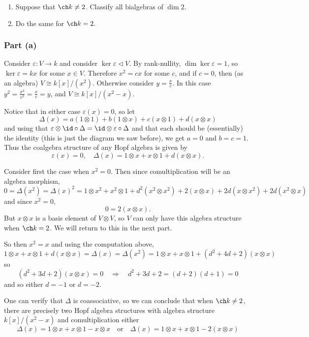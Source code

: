 \documentclass[12pt]{article}
\begin{document}
\begin{prob}
	\begin{enumerate}
		\item Suppose that $\ch k\ne 2$. Classify all bialgebras of $\dim 2.$
		\item Do the same for $\ch k = 2.$
	\end{enumerate}
\end{prob}
\begin{sol}
	\subsubsection*{Part (a)}
	Consider $\varepsilon:V\to k$ and consider $\ker\varepsilon\lhd V$. By rank-nullity, $\dim\ker\varepsilon= 1$, so
	$\ker\varepsilon=kx$ for some $x\in V$. Therefore $x^2=cx$ for some $c$, and if $c=0$, then (as an algebra) $V\cong k[x]/(x^2)$.
	Otherwise consider $y=\frac{x}{c}$. In this case $y^2=\frac{x^2}{c^2}=\frac{x}{c}=y$, and $V\cong k[x]/(x^2-x)$.

	Notice that in either case $\varepsilon(x)=0$, so let
	\[\Delta(x)=a(1\otimes 1)+b(1\otimes x)+c(x\otimes 1) + d(x\otimes x)\]
	and using that $\varepsilon\otimes \id\circ\Delta=\id\otimes\varepsilon\circ\Delta$
	and that each should be (essentially) the identity (this is just the diagram we saw before),
	we get $a=0$ and $b=c=1$. Thus the coalgebra structure of any Hopf algebra is given by 
	\[\varepsilon(x)=0,\quad \Delta(x)=1\otimes x+x\otimes 1+d(x\otimes x).\]

	Consider first the case when $x^2=0$. Then since comultiplication will be an algebra morphism,
	\[0=\Delta(x^2)=\Delta(x)^2=1\otimes x^2+x^2\otimes 1+d^2(x^2\otimes x^2)+2(x\otimes x)+2d(x\otimes x^2)+2d(x^2\otimes x)\]
	and since $x^2=0$, 
	\[0=2(x\otimes x).\]
	But $x\otimes x$ is a basis element of $V\otimes V$, so $V$ can only have this algebra structure
	when $\ch k=2$. We will return to this in the next part.

	So then $x^2=x$ and using the computation above,
	\[1\otimes x+x\otimes 1+d(x\otimes x)=\Delta(x)=\Delta(x^2)=1\otimes x+x\otimes 1+(d^2+4d+2)(x\otimes x)\]
	so
	\[(d^2+3d+2)(x\otimes x)=0\quad\Rightarrow\quad d^2+3d+2=(d+2)(d+1)=0\]
	and so either $d=-1$ or $d=-2$.

	One can verify that $\Delta$ is coassociative, so we can conclude that when $\ch k\ne 2$, 
	there are precisely two Hopf algebra structures with algebra structure $k[x]/(x^2-x)$ and
	comultiplication either
	\[\Delta(x)=1\otimes x+x\otimes 1-x\otimes x\quad\text{or}\quad \Delta(x)=1\otimes x+x\otimes 1-2(x\otimes x)\]


\end{sol}
\end{document}
